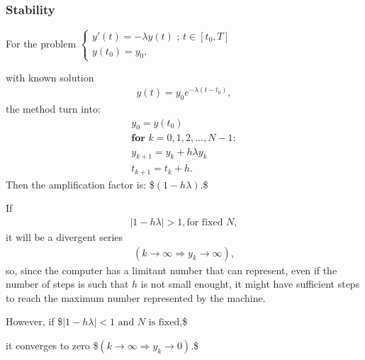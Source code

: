 \documentclass[letterpaper,10pt,english]{jupyterBook}
\begin{document}
\subsubsection{Stability}
\label{\detokenize{cap2:stability}}
\sphinxAtStartPar
For the problem
\(\begin{cases}
    y'(t) = - \lambda y(t) \text{ ; } t \in [t_0 , T] \\
    y(t_0)=y_0,
\end{cases}\)

\sphinxAtStartPar
with known solution
\begin{equation*}
\begin{split} y(t) = y_0e^{-\lambda (t-t_0)},\end{split}
\end{equation*}
\sphinxAtStartPar
the method turn into:
\begin{equation*}
\begin{split}
y_0 = y(t_0)\\
\textbf{for } k = 0, 1, 2, ..., N-1 :\\
    y_{k+1} = y_k + h \lambda y_k \\
    t_{k+1} = t_k + h.
\end{split}
\end{equation*}
\sphinxAtStartPar
Then the amplification factor is:
\$\(
(1 - h \lambda).
\)\$

\sphinxAtStartPar
If
\begin{equation*}
\begin{split}
|1 - h \lambda| > 1, \text{for fixed } N,
\end{split}
\end{equation*}
\sphinxAtStartPar
it will be a divergent series
\begin{equation*}
\begin{split}
(k \rightarrow \infty \Rightarrow y_k \rightarrow \infty),
\end{split}
\end{equation*}
\sphinxAtStartPar
so, since the computer has a limitant number that can represent, even if the number of steps is such that \(h\) is not small enought, it might have sufficient steps to reach the maximum number represented by the machine.

\sphinxAtStartPar
However, if
\$\(
    |1 - h \lambda| < 1 \text{ and } N \text{ is fixed,}
\)\$

\sphinxAtStartPar
it converges to zero
\$\(
    (k \rightarrow \infty \Rightarrow y_k \rightarrow 0 ).
\)\$
\end{document}

